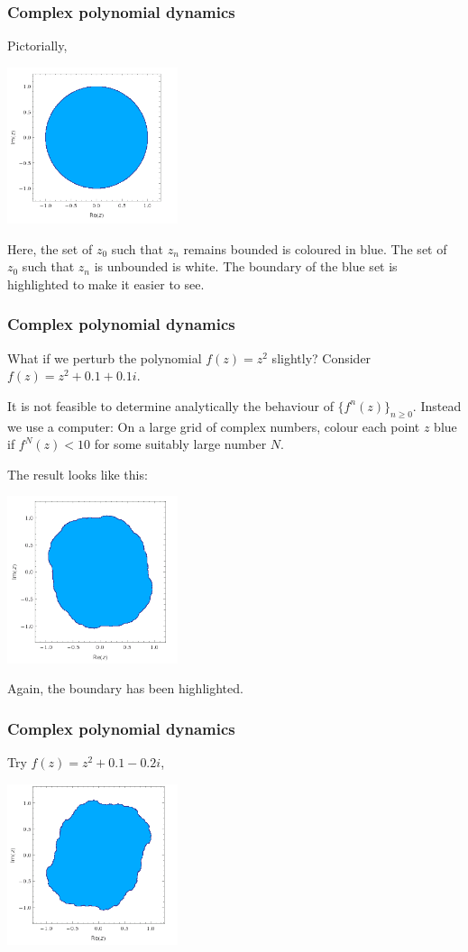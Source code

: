 \documentclass{beamer} %
\theoremstyle{definition} %
\begin{document}
\begin{frame}\frametitle{Complex polynomial dynamics}
    Pictorially,    
    \begin{center}
    \includegraphics[width=50mm]{img/circle-filled.png}
    \end{center}
    Here, the set of $z_0$ such that $z_n$ remains bounded is coloured in blue. The set of $z_0$ such that $z_n$ is 
    unbounded is white. The boundary of the blue set is highlighted to make it easier to see.
\end{frame}

\begin{frame}\frametitle{Complex polynomial dynamics}
    What if we perturb the polynomial $f(z)=z^2$ slightly? Consider $f(z) = z^2+0.1+0.1i$. 
    
    It is not feasible to determine analytically the behaviour of $\{f^n(z)\}_{n\geq 0}$.
    Instead we use a computer: On a large grid of complex numbers, colour each point $z$
    blue if $f^N(z) < 10$ for some suitably large number $N$.
    
    The result looks like this:
    \begin{center}
        \includegraphics[width=50mm]{img/julia0101-filled.png}
    \end{center}
    Again, the boundary has been highlighted.
\end{frame}

\begin{frame}\frametitle{Complex polynomial dynamics}
    Try $f(z) = z^2+0.1-0.2i$,\\
    \begin{center}
        \includegraphics[width=50mm]{img/julia01-02-filled.png}
    \end{center}
\end{frame}
\end{document}
